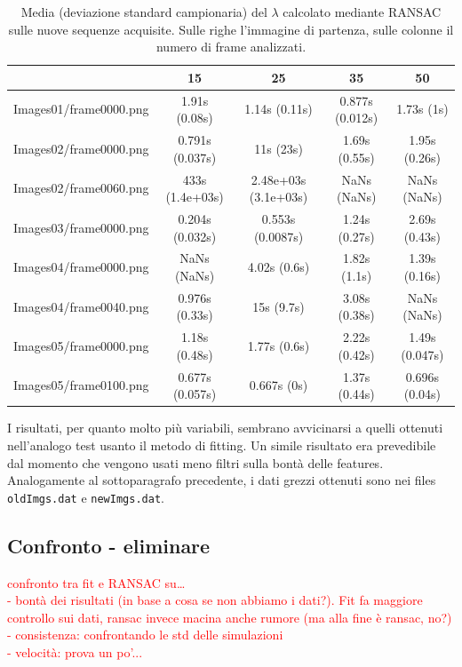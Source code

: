 \documentclass[12pt]{report}
\begin{document}
\begin{table}[H]
\begin{center}
\begin{tabular}{|c|c|c|c|c|}
	\hline
	& 15 & 25 & 35 & 50 \\ \hline
	Images01/frame0000.png & 1.91s (0.08s) & 1.14s (0.11s) & 0.877s (0.012s) & 1.73s (1s)\\ \hline
	Images02/frame0000.png & 0.791s (0.037s) & 11s (23s) & 1.69s (0.55s) & 1.95s (0.26s)\\ \hline
	Images02/frame0060.png & 433s (1.4e+03s) & 2.48e+03s (3.1e+03s) & NaNs (NaNs) & NaNs (NaNs)\\ \hline
	Images03/frame0000.png & 0.204s (0.032s) & 0.553s (0.0087s) & 1.24s (0.27s) & 2.69s (0.43s)\\ \hline
	Images04/frame0000.png & NaNs (NaNs) & 4.02s (0.6s) & 1.82s (1.1s) & 1.39s (0.16s)\\ \hline
	Images04/frame0040.png & 0.976s (0.33s) & 15s (9.7s) & 3.08s (0.38s) & NaNs (NaNs)\\ \hline
	Images05/frame0000.png & 1.18s (0.48s) & 1.77s (0.6s) & 2.22s (0.42s) & 1.49s (0.047s)\\ \hline
	Images05/frame0100.png & 0.677s (0.057s) & 0.667s (0s) & 1.37s (0.44s) & 0.696s (0.04s)\\ \hline
\end{tabular}
\caption{Media (deviazione standard campionaria) del $\lambda$ calcolato mediante RANSAC sulle nuove sequenze acquisite. Sulle righe l'immagine di partenza, sulle colonne il numero di frame analizzati.}
\label{tab:ransNew}
\end{center}
\end{table}

\noindent I risultati, per quanto molto pi\`u variabili, sembrano avvicinarsi a quelli ottenuti nell'analogo test usanto il metodo di fitting. Un simile risultato era prevedibile dal momento che vengono usati meno filtri sulla bont\`a delle features. \\

\noindent Analogamente al sottoparagrafo precedente, i  dati grezzi ottenuti sono nei files \verb|oldImgs.dat| e \verb|newImgs.dat|.




\subsection{Confronto - eliminare}

\noindent \textcolor{red}{confronto tra fit e RANSAC su\dots\\
- bont\`a dei risultati (in base a cosa se non abbiamo i dati?). Fit fa maggiore controllo sui dati, ransac invece macina anche rumore (ma alla fine \`e ransac, no?) \\
- consistenza: confrontando le std delle simulazioni \\
- velocit\`a: prova un po'...}
\end{document}
